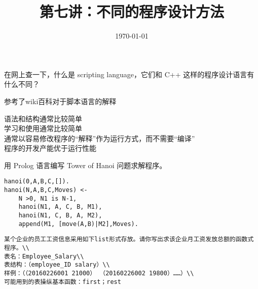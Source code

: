 \documentclass[11pt, a4paper, UTF8]{ctexart}
\title{第七讲：不同的程序设计方法}
\date{\today}     %
\begin{document}
\maketitle
\noplagiarism	%
\beginthishw	%

\begin{problem}[网站: 1]	%
  在网上查一下，什么是 scripting language，它们和 C++ 这样的程序设计语言有什么不同？
\end{problem}

\begin{remark}	%
  参考了wiki百科对于脚本语言的解释
\end{remark}

\begin{solution}
语法和结构通常比较简单\\
学习和使用通常比较简单\\
通常以容易修改程序的“解释”作为运行方式，而不需要“编译”\\
程序的开发产能优于运行性能\\
\end{solution}

\begin{problem}[网站: 2]
用 Prolog 语言编写 Tower of Hanoi 问题求解程序。
\end{problem}

\begin{solution}
\begin{verbatim}
hanoi(0,A,B,C,[]).
hanoi(N,A,B,C,Moves) <-
    N >0, N1 is N-1,
    hanoi(N1, A, C, B, M1),
    hanoi(N1, C, B, A, M2),
    append(M1, [move(A,B)|M2],Moves).
\end{verbatim}
\end{solution}

\begin{problem}[网站: 3]
\begin{verbatim}
某个企业的员工工资信息采用如下list形式存放。请你写出求该企业月工资发放总额的函数式程序。\\
表名：Employee_Salary\\
表结构：（employee_ID salary）\\
样例：（（20160226001 21000） （20160226002 19800）……）\\
可能用到的表操纵基本函数：first；rest
\end{verbatim}
\end{problem}
\end{document}
